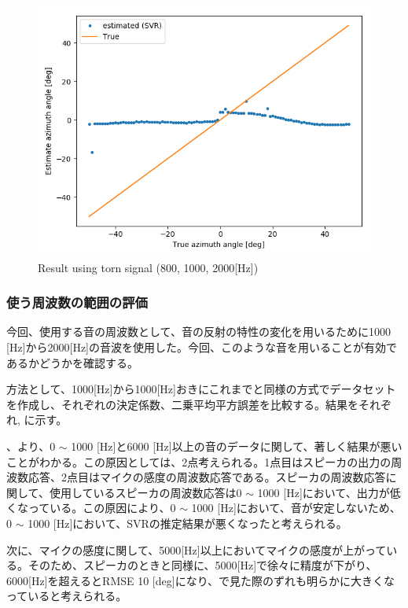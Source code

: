 \begin{figure}[ht]
  \begin{center}
  \vspace{1zh}
    \includegraphics[width=0.5\linewidth]{images/3_svr_1015_PTo01.png}   
  \end{center}
  \caption{Result using torn signal (800, 1000, 2000[Hz])}
  \label{fig:result_sound_kind_ver2}
\end{figure}
\fi

\clearpage

\subsubsection{使う周波数の範囲の評価}
\label{sec:result_svr_freq_renge}
今回、使用する音の周波数として、音の反射の特性の変化を用いるために1000 [Hz]から2000[Hz]の音波を使用した。今回、このような音を用いることが有効であるかどうかを確認する。

方法として、1000[Hz]から1000[Hz]おきにこれまでと同様の方式でデータセットを作成し、それぞれの決定係数、二乗平均平方誤差を比較する。結果をそれぞれ, に示す。

、より、0 $\sim$ 1000 [Hz]と6000 [Hz]以上の音のデータに関して、著しく結果が悪いことがわかる。この原因としては、2点考えられる。1点目はスピーカの出力の周波数応答、2点目はマイクの感度の周波数応答である。スピーカの周波数応答に関して、使用しているスピーカの周波数応答は0 $\sim$ 1000 [Hz]において、出力が低くなっている。この原因により、0 $\sim$ 1000 [Hz]において、音が安定しないため、0 $\sim$ 1000 [Hz]において、SVRの推定結果が悪くなったと考えられる。

次に、マイクの感度に関して、5000[Hz]以上においてマイクの感度が上がっている。そのため、スピーカのときと同様に、5000[Hz]で徐々に精度が下がり、6000[Hz]を超えるとRMSE 10 [deg]になり、で見た際のずれも明らかに大きくなっていると考えられる。

